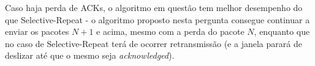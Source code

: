 \begin{enumerate}[leftmargin=\labelsep]

        Caso haja perda de ACKs, o algoritmo em questão tem melhor desempenho do que
        Selective-Repeat - o algoritmo proposto nesta pergunta consegue continuar
        a enviar os pacotes $N + 1$ e acima, mesmo com a perda do pacote $N$,
        enquanto que no caso de Selective-Repeat terá de ocorrer retransmissão
        (e a janela parará de deslizar até que o mesmo seja \textit{acknowledged}).

\end{enumerate}